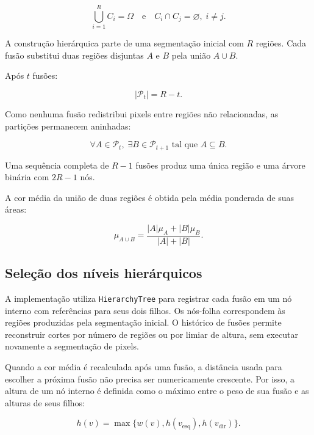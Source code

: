 \documentclass[12pt]{article}
\begin{document}
\begin{equation}
\bigcup_{i=1}^{R} C_i=\Omega
\quad\text{e}\quad
C_i\cap C_j=\varnothing,\;i\neq j.
\end{equation}

A construção hierárquica parte de uma segmentação
inicial com $R$ regiões. Cada fusão substitui
duas regiões disjuntas $A$ e $B$ pela união
$A\cup B$.

Após $t$ fusões:

\begin{equation}
|\mathcal{P}_t|=R-t.
\end{equation}

Como nenhuma fusão redistribui pixels entre
regiões não relacionadas, as partições permanecem
aninhadas:

\begin{equation}
\forall A\in\mathcal{P}_t,\;
\exists B\in\mathcal{P}_{t+1}
\text{ tal que } A\subseteq B.
\label{eq:aninhamento}
\end{equation}

Uma sequência completa de $R-1$ fusões produz
uma única região e uma árvore binária com
$2R-1$ nós.

A cor média da união de duas regiões é obtida
pela média ponderada de suas áreas:

\begin{equation}
\mu_{A\cup B}=
\frac{|A|\mu_A+|B|\mu_B}{|A|+|B|}.
\label{eq:media}
\end{equation}

\subsection{Seleção dos níveis hierárquicos}

A implementação utiliza \texttt{HierarchyTree} para registrar cada fusão
em um nó interno com referências para seus dois filhos. Os nós-folha
correspondem às regiões produzidas pela segmentação inicial. O histórico
de fusões permite reconstruir cortes por número de regiões ou por limiar
de altura, sem executar novamente a segmentação de pixels.

Quando a cor média é recalculada após uma fusão, a distância usada para
escolher a próxima fusão não precisa ser numericamente crescente.
Por isso, a altura de um nó interno é definida como o máximo entre
o peso de sua fusão e as alturas de seus filhos:

\begin{equation}
h(v)=\max\{w(v),h(v_{\mathrm{esq}}),h(v_{\mathrm{dir}})\}.
\label{eq:altura}
\end{equation}
\end{document}
